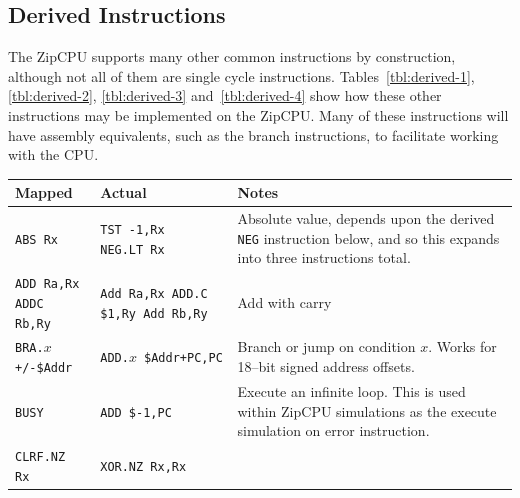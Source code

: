 \documentclass{gqtekspec}
\begin{document}
\subsection{Derived Instructions}
The ZipCPU supports many other common instructions by construction, although
not all of them are single cycle instructions.  Tables~\ref{tbl:derived-1}, \ref{tbl:derived-2}, \ref{tbl:derived-3} and~\ref{tbl:derived-4} show how these
other instructions may be implemented on the ZipCPU.  Many of these
instructions will have assembly equivalents,
such as the branch instructions, to facilitate working with the CPU.
\begin{table}\begin{center}
\begin{tabular}{p{1.0in}p{1.5in}p{3in}}\\\hline
Mapped & Actual  & Notes \\\hline
{\tt ABS Rx}
	& \parbox[t]{1.5in}{\tt TST -1,Rx\\NEG.LT Rx}
	& Absolute value, depends upon the derived {\tt NEG} instruction
	below, and so this expands into three instructions total.\\\hline
\parbox[t]{1.4in}{\tt ADD Ra,Rx\\ADDC Rb,Ry}
	& \parbox[t]{1.5in}{\tt Add Ra,Rx\\ADD.C \$1,Ry\\Add Rb,Ry}
	& Add with carry \\\hline
\hbox{\tt BRA.$x$ +/-\$Addr}
	& \hbox{\tt ADD.$x$ \$Addr+PC,PC}
	& Branch or jump on condition $x$.  Works for 18--bit
		signed address offsets.\\\hline
{\tt BUSY } & {\tt ADD \$-1,PC} & Execute an infinite loop.  This is used
	within ZipCPU simulations as the execute simulation on error
	instruction. \\\hline
{\tt CLRF.NZ Rx }
	& {\tt XOR.NZ Rx,Rx}

\end{tabular}
\end{center}
\end{table}
\end{document}
